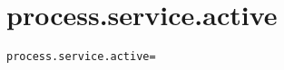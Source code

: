 \section{process.service.active}
\label{configuration:ProcessServiceActive}
\ClearAPI
\TODO
\begin{lstlisting}[style=Props,caption={Usage example for \textit{process.service.active}}]
process.service.active=
\end{lstlisting}